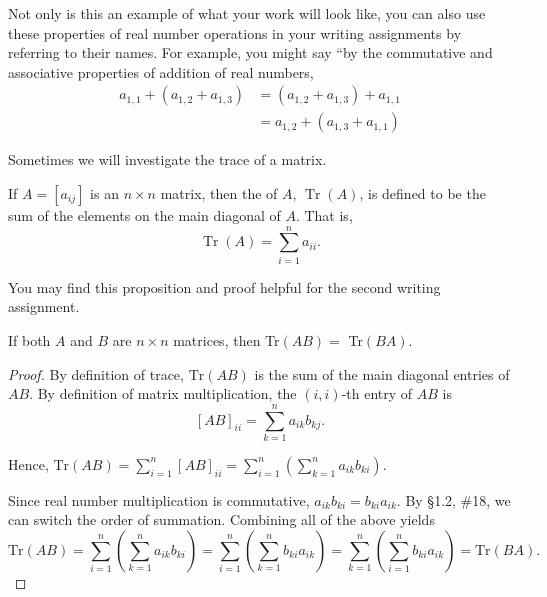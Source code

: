 \documentclass{amsart}
\DeclareMathOperator{\trace}{Tr}
\begin{document}
Not only is this an example of what your work will look like, you can also use these properties of real number operations in your writing assignments by referring to their names.  For example, you might say ``by the commutative and associative properties of addition of real numbers, 
\begin{align*}
a_{1,1} + (a_{1,2} + a_{1,3}) 
    &= (a_{1,2} + a_{1,3}) + a_{1,1}\\ 
    &= a_{1,2} + (a_{1,3} + a_{1,1})
\end{align*}

Sometimes we will investigate the trace of a matrix.

\begin{defn*} If $A = [a_{ij}]$ is an $n \times n$ matrix, then the  of $A$, $\trace(A)$, is defined to be the sum of the elements on the main diagonal of $A$.  That is, 
\[
\trace(A) = \sum_{i = 1}^n a_{ii}.
\]
\end{defn*}

You may find this proposition and proof helpful for the second writing assignment.

\begin{prop*}[\S1.3, \#43c]  If both $A$ and $B$ are $n \times n$ matrices, then Tr$(AB) =$ Tr$(BA)$. \end{prop*}

\begin{proof} By definition of trace, $\text{Tr}(AB)$ is the sum of the main diagonal entries of $AB$. By definition of matrix multiplication, the $(i,i)$-th entry of $AB$ is 
\[ [AB]_{ii} = \sum_{k=1}^{n} a_{ik} b_{kj}.\]

Hence, $\text{Tr}(AB) = \sum_{i=1}^n [AB]_{ii} =\sum_{i=1}^n \left( \sum_{k=1}^n a_{ik} b_{ki} \right)$.

Since real number multiplication is commutative, $a_{ik} b_{ki} = b_{ki} a_{ik}$.  By \S1.2, \#18, we can switch the order of summation.  Combining all of the above yields
\[
\text{Tr}(AB) = \sum_{i=1}^n \left( \sum_{k=1}^n a_{ik} b_{ki} \right) = \sum_{i=1}^n \left( \sum_{k=1}^n b_{ki} a_{ik} \right) 
= \sum_{k=1}^n \left( \sum_{i=1}^n b_{ki} a_{ik} \right) = \text{Tr}(BA). 
\]
\end{proof}

\end{document}
